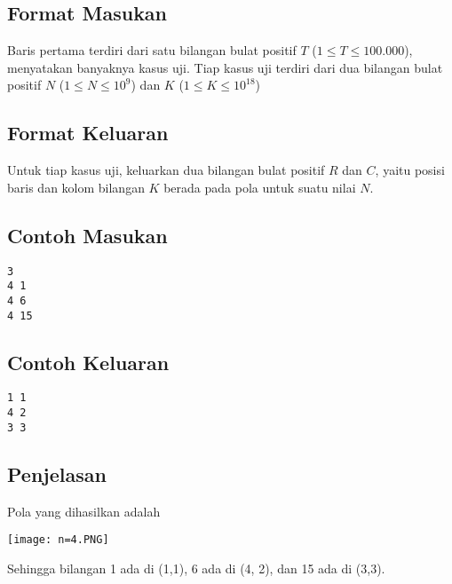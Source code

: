 \documentclass{article}
\begin{document}
\subsection*{Format Masukan}

Baris pertama terdiri dari satu bilangan bulat positif $T$ ($1 \leq T \leq 100.000$), menyatakan banyaknya kasus uji.
Tiap kasus uji terdiri dari dua bilangan bulat positif $N$ ($1 \leq N \leq 10^{9}$) dan $K$ ($1 \leq K \leq 10^{18}$)

\subsection*{Format Keluaran}

Untuk tiap kasus uji, keluarkan dua bilangan bulat positif $R$ dan $C$, yaitu posisi baris dan kolom bilangan $K$ berada pada 
pola untuk suatu nilai $N$.

\pagebreak

\begin{multicols}{2}
\subsection*{Contoh Masukan}
\begin{lstlisting}
3
4 1
4 6
4 15
\end{lstlisting}
\columnbreak
\subsection*{Contoh Keluaran}
\begin{lstlisting}
1 1
4 2
3 3
\end{lstlisting}
\vfill
\null
\end{multicols}

\subsection*{Penjelasan}
Pola yang dihasilkan adalah
\begin{center}
    \texttt{[image: n=4.PNG]}
\end{center}
Sehingga bilangan 1 ada di (1,1), 6 ada di (4, 2), dan 15 ada di (3,3).

\pagebreak
\end{document}
